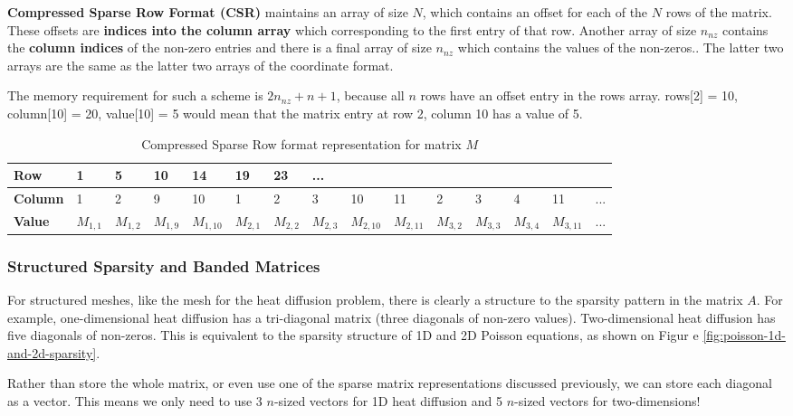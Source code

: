 \documentclass{article}
\begin{document}
\textbf{Compressed Sparse Row Format (CSR)} maintains an array of size $N$, which contains an offset for each of the $N$ rows of the matrix. These offsets are \textbf{indices into the column array} which corresponding to the first entry of that row. Another array of size $n_{nz}$ contains the \textbf{column indices} of the non-zero entries and there is a final array of size $n_{nz}$ which contains the values of the non-zeros.. The latter two arrays are the same as the latter two arrays of the coordinate format.

The memory requirement for such a scheme is $2n_{nz} + n + 1$, because all $n$ rows have an offset entry in the rows array. rows[2] = 10, column[10] = 20, value[10] = 5 would mean that the matrix entry at row 2, column 10 has a value of 5.

\begin{table}
	\centering
	\begin{tabular}{|l|llllllllllllll|}
		\hline
		\textbf{Row} & 1 & 5 & 10 & 14 & 19 & 23 & ... &&&&&&& \\
		\hline
		\textbf{Column} & 1 & 2 & 9 & 10 & 1 & 2 & 3 & 10 & 11 & 2 & 3 & 4 & 11 & ... \\
		\hline
		\textbf{Value} & $M_{1,1}$ & $M_{1,2}$ & $M_{1,9}$ & $M_{1,10}$ & $M_{2,1}$ & $M_{2,2}$ & $M_{2,3}$ & $M_{2,10}$ & $M_{2,11}$ & $M_{3,2}$ & $M_{3,3}$ & $M_{3,4}$ & $M_{3,11}$ & ... \\
		\hline
	\end{tabular}
	\caption{Compressed Sparse Row format representation for matrix $M$}
	\label{tab:compressed-sparse-row-format}
\end{table}

\subsubsection{Structured Sparsity and Banded Matrices}

For structured meshes, like the mesh for the heat diffusion problem, there is clearly a structure to the sparsity pattern in the matrix $A$. For example, one-dimensional heat diffusion has a tri-diagonal matrix (three diagonals of non-zero values). Two-dimensional heat diffusion has five diagonals of non-zeros.  This is equivalent to the sparsity structure of 1D and 2D Poisson equations, as shown on Figur e \ref{fig:poisson-1d-and-2d-sparsity}.

Rather than store the whole matrix, or even use one of the sparse matrix representations discussed previously, we can store each diagonal as a vector. This means we only need to use 3 $n$-sized vectors for 1D heat diffusion and 5 $n$-sized vectors for two-dimensions!
\end{document}
